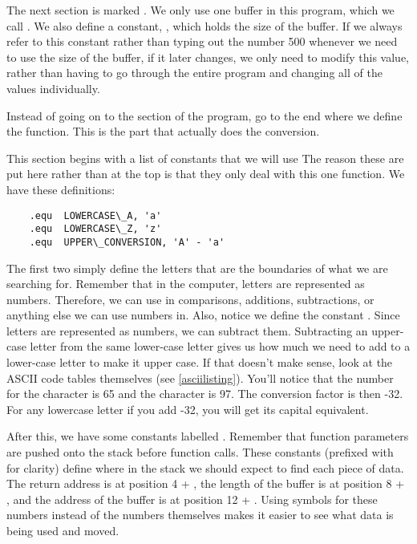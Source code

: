 The next section is marked .  We only use one buffer in
this program, which we call .  We also define a 
constant, , which holds the size of the buffer.  If
we always refer to this constant rather than typing out the number 500 whenever
we need to use the size of the buffer, if it later changes, we only need to modify
this value, rather than having to go through the entire program and changing all
of the values individually.

Instead of going on to the  section of the program, go
to the end where we define the  function.  
This is the part that actually does the conversion.

This section begins with a list of constants that we will use 
The reason these are put here rather than at the top is that they only
deal with this one function.  We have these definitions:

\begin{simpletyping}
\begin{lstlisting}
	.equ  LOWERCASE\_A, 'a'
	.equ  LOWERCASE\_Z, 'z'
	.equ  UPPER\_CONVERSION, 'A' - 'a' 
\end{lstlisting}
\end{simpletyping}

The first two simply define the letters that are the boundaries of what we are
searching for.  Remember that in the computer, letters are represented as numbers.
Therefore, we can use  in comparisons, additions,
subtractions, or anything else we can use numbers in.  Also, notice we define
the constant .  Since letters are represented
as numbers, we can subtract them.  Subtracting an upper-case letter from the
same lower-case letter gives us how much we need to add to a lower-case letter
to make it upper case.  If that doesn't make sense, look at the 
ASCII code tables 
themselves (see \autoref{asciilisting}).  You'll
notice that the number for the character  is 65 and the 
character  is 97.  The conversion factor is then -32.
For any lowercase letter if you add -32, you will get its 
capital equivalent.

After this, we have some constants labelled .
Remember that function parameters 
are pushed onto the stack before function calls.  These constants (prefixed with
 for clarity) define where in the stack we should expect
to find each piece of data.  The return address is at position 4 + {\espReg}, the length of 
the buffer is at position 8 + {\espReg}, and the address of the buffer is at position 
12 + {\espReg}.   Using symbols for these numbers instead of the numbers themselves
makes it easier to see what data is being used and moved.

